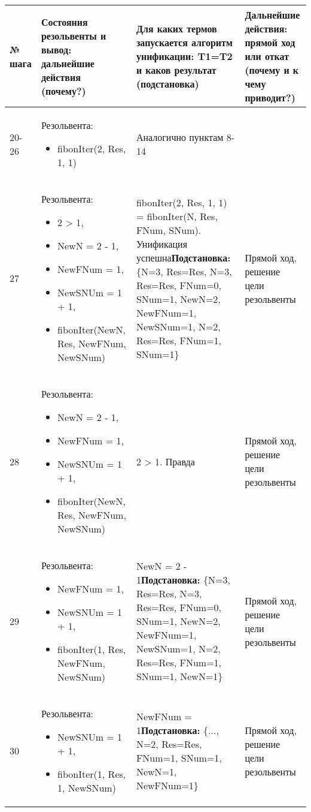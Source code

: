 \documentclass[14pt,a4paper]{scrreprt}
\begin{document}
\begin{table}[H]
	\begin{tabular}{|p{0.8cm\small}|p{4.7cm\small}|p{5.7cm\small}|p{4cm\small}|}	
		\hline
		№ шага & Состояния резольвенты и вывод: дальнейшие действия (почему?) & Для каких термов запускается алгоритм унификации: T1=T2 и каков результат (подстановка) & Дальнейшие действия: прямой ход или откат (почему и к чему приводит?)\\
		\hline
		20-26 & Резольвента:\begin{itemize} \item fibonIter(2, Res, 1, 1) \end{itemize} & Аналогично пунктам 8-14 & \\
		\hline
		27 & Резольвента:\begin{itemize} \item 2 > 1, \item NewN = 2 - 1, \item NewFNum = 1, \item NewSNUm = 1 + 1, \item fibonIter(NewN, Res, NewFNum, NewSNum)\end{itemize}  & fibonIter(2, Res, 1, 1) = fibonIter(N, Res, FNum, SNum). Унификация успешна\linebreak \textbf{Подстановка:} \{N=3, Res=Res, N=3, Res=Res, FNum=0, SNum=1, NewN=2, NewFNum=1, NewSNum=1, N=2, Res=Res, FNum=1, SNum=1\} & Прямой ход, решение цели резольвенты\\
		\hline
		28 & Резольвента:\begin{itemize} \item NewN = 2 - 1, \item NewFNum = 1, \item NewSNUm = 1 + 1, \item fibonIter(NewN, Res, NewFNum, NewSNum)\end{itemize} & 2 > 1. Правда & Прямой ход, решение цели резольвенты\\
		\hline
		29 & Резольвента:\begin{itemize} \item NewFNum = 1, \item NewSNUm = 1 + 1, \item fibonIter(1, Res, NewFNum, NewSNum)\end{itemize} & NewN = 2 - 1\linebreak \textbf{Подстановка:} \{N=3, Res=Res, N=3, Res=Res, FNum=0, SNum=1, NewN=2, NewFNum=1, NewSNum=1, N=2, Res=Res, FNum=1, SNum=1, NewN=1\} & Прямой ход, решение цели резольвенты\\
		\hline
		30 & Резольвента:\begin{itemize} \item NewSNUm = 1 + 1, \item fibonIter(1, Res, 1, NewSNum)\end{itemize} & NewFNum = 1\linebreak \textbf{Подстановка:} \{..., N=2, Res=Res, FNum=1, SNum=1, NewN=1, NewFNum=1\} & Прямой ход, решение цели резольвенты\\
		\hline
	\end{tabular}
\end{table}
\end{document}
